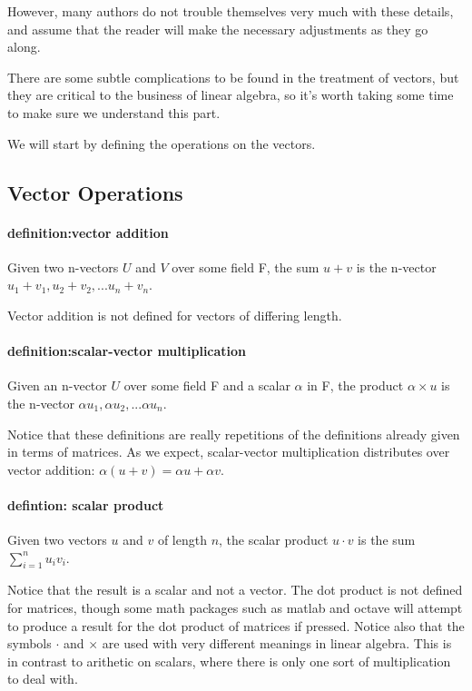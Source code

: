 \documentclass[12pt,letterpaper,final]{article}
\begin{document}
However, many authors do not trouble themselves very much with these details, and assume that the reader will make the necessary adjustments as they go along. 


There are some subtle complications to be found in the treatment of vectors, but they are critical to the business of linear algebra, so it's worth taking some time to make sure we understand this part. 

We will start by defining the operations on the vectors. 

\subsection{Vector Operations}
\paragraph{definition:vector addition} Given two n-vectors $U$ and $V$ over some field F, the sum $u + v$ is the n-vector $u_1+v_1, u_2+v_2, ... u_n+v_n$. 

Vector addition is not defined for vectors of differing length. 

\paragraph{definition:scalar-vector multiplication} Given an n-vector $U$ over some field F and a scalar $\alpha$ in F, the product  $\alpha \times u$ is the n-vector $\alpha u_1, \alpha u_2, ...\alpha u_n$. 

Notice that these definitions are really repetitions of the definitions already given in terms of matrices. As we expect, scalar-vector multiplication distributes over vector addition: $\alpha (u +v) = \alpha u + \alpha v$. 

\paragraph{defintion: scalar product} Given two vectors $u$ and $v$ of length $n$, the scalar product $u \cdot v$ is the sum $\sum_{i=1}^{n}u_iv_i$. 

Notice that the result is a scalar and not a vector. The dot product is not defined for matrices, though some math packages such as matlab and octave will attempt to produce a result for the dot product of matrices if pressed. Notice also that the symbols $\cdot$ and $\times$ are used with very different meanings in linear algebra. This is in contrast to arithetic on scalars, where there is only one sort of multiplication to deal with. 
\end{document}
